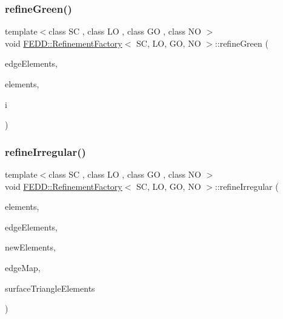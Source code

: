 \subsubsection{\texorpdfstring{refine\+Green()}{refineGreen()}}
{\footnotesize\ttfamily template$<$class SC , class LO , class GO , class NO $>$ \\
void \hyperlink{classFEDD_1_1RefinementFactory}{F\+E\+D\+D\+::\+Refinement\+Factory}$<$ SC, LO, GO, NO $>$\+::refine\+Green (\begin{DoxyParamCaption}\item[{\hyperlink{classFEDD_1_1RefinementFactory_ae5285e990ec4632d6188a1280627ad13}{Edge\+Elements\+Ptr\+\_\+\+Type}}]{edge\+Elements,  }\item[{\hyperlink{classFEDD_1_1RefinementFactory_a0994b5b7b6d080048673941251999f2e}{Elements\+Ptr\+\_\+\+Type}}]{elements,  }\item[{int}]{i }\end{DoxyParamCaption})}

\mbox{\label{classFEDD_1_1RefinementFactory_ae4401ece866b918923322d46d0c5e33e}} 
\subsubsection{\texorpdfstring{refine\+Irregular()}{refineIrregular()}}
{\footnotesize\ttfamily template$<$class SC , class LO , class GO , class NO $>$ \\
void \hyperlink{classFEDD_1_1RefinementFactory}{F\+E\+D\+D\+::\+Refinement\+Factory}$<$ SC, LO, GO, NO $>$\+::refine\+Irregular (\begin{DoxyParamCaption}\item[{\hyperlink{classFEDD_1_1RefinementFactory_a0994b5b7b6d080048673941251999f2e}{Elements\+Ptr\+\_\+\+Type}}]{elements,  }\item[{\hyperlink{classFEDD_1_1RefinementFactory_ae5285e990ec4632d6188a1280627ad13}{Edge\+Elements\+Ptr\+\_\+\+Type}}]{edge\+Elements,  }\item[{int \&}]{new\+Elements,  }\item[{\hyperlink{classFEDD_1_1RefinementFactory_a8256ccdf1b2a5c977ddc011f4e8eb8d3}{Map\+Const\+Ptr\+\_\+\+Type}}]{edge\+Map,  }\item[{\hyperlink{classFEDD_1_1RefinementFactory_a1067ba23325b19eae16a864f25f7d68f}{Surface\+Elements\+Ptr\+\_\+\+Type}}]{surface\+Triangle\+Elements }\end{DoxyParamCaption})}

